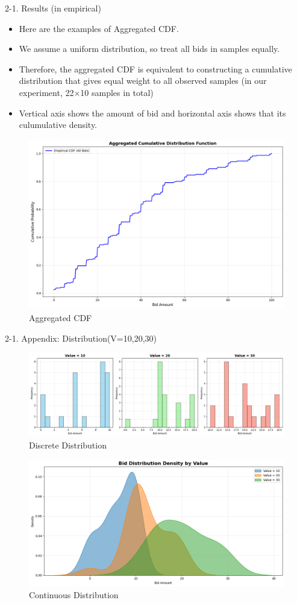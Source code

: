 \documentclass{beamer}
\begin{document}
\begin{frame}{2-1. Results (in empirical)}
\begin{itemize}
    \item Here are the examples of Aggregated CDF.
    \item We assume a uniform distribution, so treat all bids in samples equally.
    \item Therefore, the aggregated CDF is equivalent to constructing a cumulative distribution that gives equal weight to all observed samples (in our experiment, 22×10 samples in total)
    \item Vertical axis shows the amount of bid and horizontal axis shows that its culumulative density.
\end{itemize}
\begin{figure}
    \centering
    \includegraphics[width=0.4\linewidth]{332Project1//figures/AggregatedCDF.png}
    \caption{Aggregated CDF}
    \label{fig:placeholder}
\end{figure}
\end{frame}

\begin{frame}{2-1. Appendix: Distribution(V=10,20,30)}
    \begin{figure}
        \centering
        \includegraphics[width=0.7\linewidth]{332Project1/figures/barplot.png}
        \caption{Discrete Distribution}
        \label{fig:placeholder}
    \end{figure}
    \begin{figure}
        \centering
        \includegraphics[width=0.5\linewidth]{332Project1/figures/Distribution.png}
        \caption{Continuous Distribution}
        \label{fig:placeholder}
    \end{figure}
\end{frame}
\end{document}
